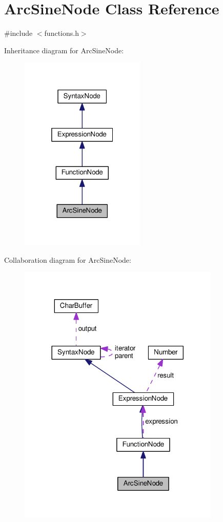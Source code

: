 \hypertarget{classArcSineNode}{}\section{Arc\+Sine\+Node Class Reference}
\label{classArcSineNode}


{\ttfamily \#include $<$functions.\+h$>$}



Inheritance diagram for Arc\+Sine\+Node\+:\nopagebreak
\begin{figure}[H]
\begin{center}
\leavevmode
\includegraphics[width=169pt]{classArcSineNode__inherit__graph}
\end{center}
\end{figure}


Collaboration diagram for Arc\+Sine\+Node\+:\nopagebreak
\begin{figure}[H]
\begin{center}
\leavevmode
\includegraphics[width=272pt]{classArcSineNode__coll__graph}
\end{center}
\end{figure}
